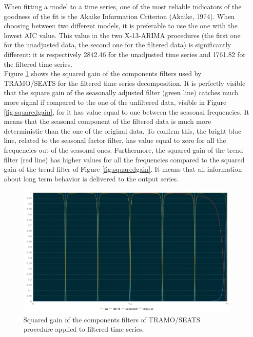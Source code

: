 \documentclass[english,blauw]{cbsdiscussionpaper}
\begin{document}
When fitting a model to a time series, one of the most reliable indicators of the goodness of the fit is the Akaike Information Criterion (Akaike, 1974). When choosing between two different models, it is preferable to use the one with the lowest AIC value. This value in the two X-13-ARIMA procedures (the first one for the unadjusted data, the second one for the filtered data) is significantly different: it is respectively 2842.46 for the unadjusted time series and 1761.82 for the filtered time series.\\Figure \ref{fig:gainfilters} shows the squared gain of the components filters used by TRAMO/SEATS for the filtered time series decomposition. It is perfectly visible that the square gain of the seasonally adjusted filter (green line) catches much more signal if compared to the one of the unfiltered data, visible in Figure \ref{fig:squaredgain}, for it has value equal to one between the seasonal frequencies. It means that the seasonal component of the filtered data is much more deterministic than the one of the original data. To confirm this, the bright blue line, related to the seasonal factor filter, has value equal to zero for all the frequencies out of the seasonal ones. Furthermore, the squared gain of the trend filter (red line) has higher values for all the frequencies compared to the squared gain of the trend filter of Figure \ref{fig:squaredgain}. It means that all information about long term behavior is delivered to the output series.
\begin{figure}[h]
\includegraphics[width=\textwidth]{../images/capitolo4/gainfilters.jpg}
\caption{Squared gain of the components filters of TRAMO/SEATS procedure applied to filtered time series.}
\label{fig:gainfilters}
\end{figure}
\end{document}
